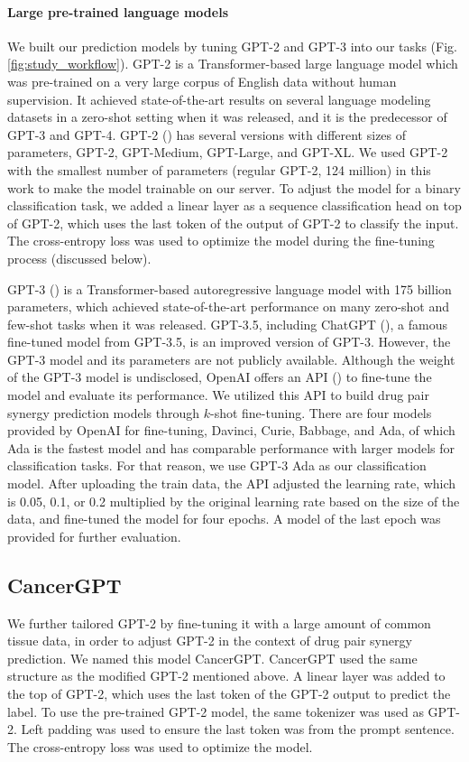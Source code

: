 \paragraph{Large pre-trained language models}

We built our prediction models by tuning GPT-2 and GPT-3 into our tasks (Fig. \ref{fig:study_workflow}).  GPT-2 is a Transformer-based large language model which was pre-trained on a very large corpus of English data without human supervision. It achieved state-of-the-art results on several language modeling datasets in a zero-shot setting when it was released, and it is the predecessor of GPT-3 and GPT-4. GPT-2 (\cite{radford_language_nodate}) has several versions with different sizes of parameters, GPT-2, GPT-Medium, GPT-Large, and GPT-XL. We used GPT-2 with the smallest number of parameters (regular GPT-2, 124 million) in this work to make the model trainable on our server. To adjust the model for a binary classification task, we added a linear layer as a sequence classification head on top of GPT-2, which uses the last token of the output of GPT-2 to classify the input. The cross-entropy loss was used to optimize the model during the fine-tuning process (discussed below). 

 GPT-3 (\cite{brown_language_2020}) is a Transformer-based autoregressive language model with 175 billion parameters, which achieved state-of-the-art performance on many zero-shot and few-shot tasks when it was released. GPT-3.5, including ChatGPT (\cite{openai_chatgpt}), a famous fine-tuned model from GPT-3.5, is an improved version of GPT-3. However, the GPT-3 model and its parameters are not publicly available.  Although the weight of the GPT-3 model is undisclosed, OpenAI offers an API (\cite{openai_finetuning}) to fine-tune the model and evaluate its performance. We utilized this API to build drug pair synergy prediction models through $k$-shot fine-tuning. There are four models provided by OpenAI for fine-tuning, Davinci, Curie, Babbage, and Ada, of which Ada is the fastest model and has comparable performance with larger models for classification tasks. For that reason, we use GPT-3 Ada as our classification model. After uploading the train data, the API adjusted the learning rate, which is 0.05, 0.1, or 0.2 multiplied by the original learning rate based on the size of the data, and fine-tuned the model for four epochs. A model of the last epoch was provided for further evaluation. 

 \subsection{CancerGPT}
 \label{sec:cancergpt2}
 We further tailored GPT-2 by fine-tuning it with a large amount of common tissue data, in order to adjust GPT-2 in the context of drug pair synergy prediction. We named this model CancerGPT. CancerGPT used the same structure as the modified GPT-2 mentioned above. A linear layer was added to the top of GPT-2, which uses the last token of the GPT-2 output to predict the label. To use the pre-trained GPT-2 model, the same tokenizer was used as GPT-2. Left padding was used to ensure the last token was from the prompt sentence. The cross-entropy loss was used to optimize the model.  

